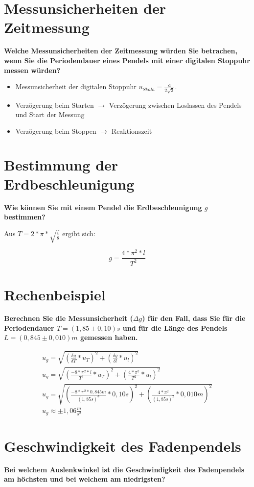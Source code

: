 \documentclass[a4paper, 12pt]{article}
\begin{document}
\section{Messunsicherheiten der Zeitmessung}
\textbf{Welche Messunsicherheiten der Zeitmessung würden Sie betrachen, wenn Sie die Periodendauer eines Pendels mit einer digitalen Stoppuhr messen würden?}

\begin{itemize}
\item{Messunsicherheit der digitalen Stoppuhr $u_{Skala}=\frac{a}{2\sqrt{3}}$.}
\item{Verzögerung beim Starten $\rightarrow$ Verzögerung zwischen Loslassen des Pendels und Start der Messung}
\item{Verzögerung beim Stoppen $\rightarrow$ Reaktionszeit}
\end{itemize}

\section{Bestimmung der Erdbeschleunigung}
\textbf{Wie können Sie mit einem Pendel die Erdbeschleunigung $g$ bestimmen?}

Aus $T=2*\pi*\sqrt{\frac{l}{g}}$ ergibt sich:

$$g=\frac{4*\pi^2*l}{T^2}$$

\section{Rechenbeispiel}
\textbf{Berechnen Sie die Messunsicherheit ($\Delta g$) für den Fall, dass Sie für die Periodendauer $T=
(1,85 \pm 0,10)s$ und für die Länge des Pendels $L= (0,845 \pm 0,010)m$ gemessen haben.}

\begin{equation*}
\begin{split}
u_g=\sqrt{(\frac{\delta g}{\delta T}*u_T)^2+(\frac{\delta g}{\delta l}*u_l)^2}\\
u_g=\sqrt{(\frac{-8*\pi^2*l}{T^3}*u_T)^2+(\frac{4*\pi^2}{T^2}*u_l)^2}\\
u_g=\sqrt{(\frac{-8*\pi^2*0,845m}{(1,85s)^3}*0,10s)^2+(\frac{4*\pi^2}{(1,85s)^2}*0,010m)^2}\\
u_g\approx \pm 1,06 \frac{m}{s^2}
\end{split}
\end{equation*}

\section{Geschwindigkeit des Fadenpendels}
\textbf{Bei welchem Auslenkwinkel ist die Geschwindigkeit des Fadenpendels am höchsten und
bei welchem am niedrigsten?}
\end{document}
